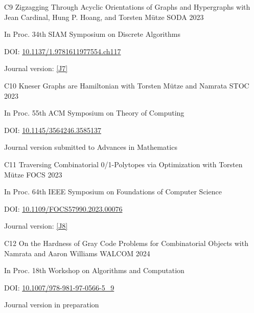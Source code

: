 \begin{cvpublication}
	{C9}
	{Zigzagging Through Acyclic Orientations of Graphs and Hypergraphs}
	{with Jean Cardinal, Hung P. Hoang, and Torsten Mütze}
	{SODA}
	{2023}
    {
	\begin{cvitems}
	\item In Proc. 34th SIAM Symposium on Discrete Algorithms
	\item[] DOI: \href{https://doi.org/10.1137/1.9781611977554.ch117}{10.1137/1.9781611977554.ch117}
	\item Journal version: \hyperlink{paperC7}{[J7]}
	\end{cvitems}
	}
\end{cvpublication}
\begin{cvpublication}
	{C10}
	{Kneser Graphs are Hamiltonian}
	{with Torsten Mütze and Namrata}
	{STOC}
	{2023}
    {
	\begin{cvitems}
	\item In Proc. 55th ACM Symposium on Theory of Computing
	\item[] DOI: \href{https://doi.org/10.1145/3564246.3585137}{10.1145/3564246.3585137}
	\item Journal version submitted to Advances in Mathematics
	\end{cvitems}
	}
\end{cvpublication}
\begin{cvpublication}
	{C11}
	{Traversing Combinatorial 0/1-Polytopes via Optimization}
	{with Torsten Mütze}
	{FOCS}
	{2023}
    {
	\begin{cvitems}
	\item In Proc. 64th IEEE Symposium on Foundations of Computer Science
	\item[] DOI: \href{https://doi.org/10.1109/FOCS57990.2023.00076}{10.1109/FOCS57990.2023.00076}
	\item Journal version: \hyperlink{paperC8}{[J8]}
	\end{cvitems}
	}
\end{cvpublication}
\begin{cvpublication}
	{C12}
	{On the Hardness of Gray Code Problems for Combinatorial Objects}
	{with Namrata and Aaron Williams}
	{WALCOM}
	{2024}
    {
	\begin{cvitems}
	\item In Proc. 18th Workshop on Algorithms and Computation
	\item[] DOI: \href{https://doi.org/10.1007/978-981-97-0566-5_9}{10.1007/978-981-97-0566-5_9}
	\item Journal version in preparation
	\end{cvitems}
	}
\end{cvpublication}
